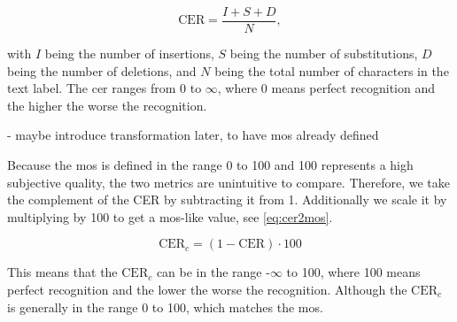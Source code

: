 \begin{equation}
    \text{CER} = \frac{I + S + D}{N},
    \label{eq:cer}
\end{equation}

with $I$ being the number of insertions, $S$ being the number of substitutions, $D$ being the number of deletions, and $N$ being the total number of characters in the text label.
The \gls{cer} ranges from 0 to $\infty$, where 0 means perfect recognition and the higher the worse the recognition.

- maybe introduce transformation later, to have mos already defined

Because the \gls{mos} is defined in the range 0 to 100 and 100 represents a high subjective quality, the two metrics are unintuitive to compare.
Therefore, we take the complement of the CER by subtracting it from 1.
Additionally we scale it by multiplying by 100 to get a \gls{mos}-like value, see \autoref{eq:cer2mos}.

\begin{equation}
    \text{CER}_{c} = (1 - \text{CER}) \cdot 100
    \label{eq:cer2mos}
\end{equation}

This means that the $\text{CER}_{c}$ can be in the range -$\infty$ to 100, where 100 means perfect recognition and the lower the worse the recognition.
Although the $\text{CER}_{c}$ is generally in the range 0 to 100, which matches the \gls{mos}.











